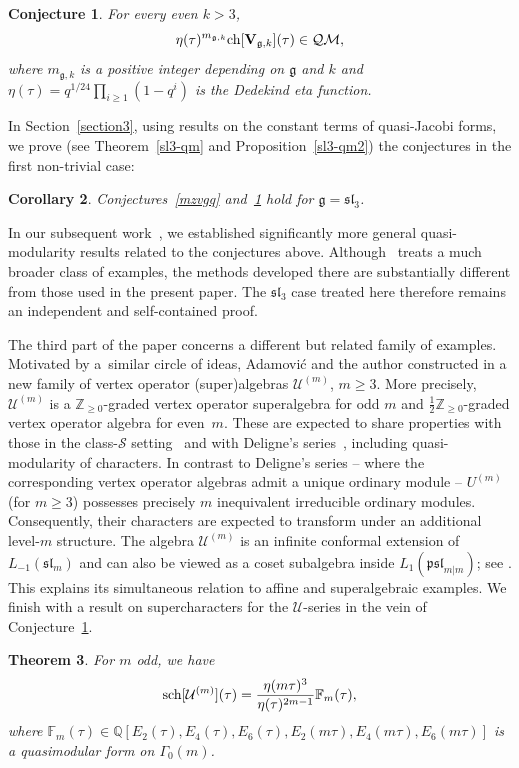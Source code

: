 \documentclass[pdftex]{sigma}
\numberwithin{equation}{section}
\newtheorem{Theorem}{Theorem}[section]
\newtheorem{Corollary}[Theorem]{Corollary}
\newtheorem{Conjecture}[Theorem]{Conjecture}
\theoremstyle{definition}
\begin{document}
\begin{Conjecture} \label{Arakawa} For every even $k >3$,
\[
\eta(\tau)^{m_{\mathfrak{g},k}} {\rm ch}[{\bf V}_{\mathfrak{g},k}](\tau) \in \mathcal{QM},
\]
where $m_{\mathfrak{g},k}$ is a positive integer depending on $\mathfrak{g}$ and $k$ and $\eta(\tau)=q^{1/24}\prod_{i \geq 1}(1-q^i)$ is the Dedekind eta function.
\end{Conjecture}

In Section~\ref{section3}, using results on the constant terms of quasi-Jacobi forms, we prove (see Theorem~\ref{sl3-qm} and Proposition~\ref{sl3-qm2}) the conjectures in the first non-trivial case:
\begin{Corollary} Conjectures~{\rm \ref{mzvgq}} and~{\rm \ref{Arakawa}} hold for $\mathfrak{g}=\mathfrak{sl}_3$.
\end{Corollary}

In our subsequent work~\cite{BVM}, we established significantly more general
quasi-modularity results related to the conjectures above. Although~\cite{BVM} treats a much broader class of examples, the methods developed there
are substantially different from those used in the present paper. The
$\mathfrak{sl}_3$ case treated here therefore remains an independent and
self-contained proof.

The third part of the paper concerns a different but related family of examples. Motivated by a~similar circle of ideas, Adamovi\'c and the author constructed in \cite{AM} a new family of vertex operator (super)algebras $\mathcal{U}^{(m)}$, $m \geq 3$. More precisely, $\mathcal{U}^{(m)}$ is a $\mathbb{Z}_{\geq 0}$-graded vertex operator superalgebra for odd $m$ and $\frac12 \mathbb{Z}_{\geq 0}$-graded vertex operator algebra for even~$m$.
These are expected to share properties with those in the class-$\mathcal{S}$ setting~\cite{BR, Beem} and with Deligne's series~\cite{AK}, including quasi-modularity of characters.
In contrast to Deligne's series -- where the corresponding vertex operator algebras admit a unique ordinary module -- $U^{(m)}$ (for $m \ge 3$) possesses precisely $m$ inequivalent irreducible ordinary modules. Consequently, their characters are expected to transform under an additional level-$m$ structure.
 The algebra $\mathcal{U}^{(m)}$ is an infinite conformal extension of $L_{-1}(\mathfrak{sl}_m)$ and can also be viewed as a coset subalgebra inside $L_1(\mathfrak{psl}_{m|m})$; see \cite[Proposition~7.1]{AM}. This explains its simultaneous relation to affine and superalgebraic examples.
We finish with a result on supercharacters for the $\mathcal{U}$-series in the vein of Conjecture~\ref{Arakawa}.
\begin{Theorem} For $m$ odd, we have
\[
{\rm sch}[\mathcal{U}^{(m)}](\tau)= \frac{\eta(m \tau)^3}{\eta(\tau)^{2m-1}} \mathbb{F}_m(\tau),
\]
where $\mathbb{F}_m(\tau) \in \mathbb{Q}[E_2(\tau),E_4(\tau),E_6(\tau),E_2(m \tau),E_4(m \tau),E_6(m \tau)]$ is a quasimodular form on $\Gamma_0(m)$.
\end{Theorem}
\end{document}
